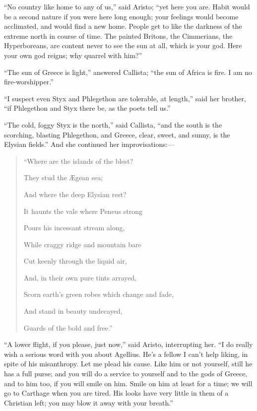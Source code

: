 ``No country like home to any of us,'' said Aristo;
``yet here you are. Habit would be a second nature if you were
here long enough; your feelings would become acclimated, and would
find a new home. People get to like the darkness of the extreme north
in course of time. The painted Britons, the Cimmerians, the
Hyperboreans, are content never to see the sun at all, which is
your god. Here your own god reigns; why quarrel with him?''

``The sun of Greece is light,'' answered Callista;
``the sun of Africa is fire. I am no fire-worshipper.''

``I suspect even Styx and Phlegethon are tolerable, at
length,'' said her brother, ``if Phlegethon and Styx there be,
as the poets tell us.''

``The cold, foggy Styx is the north,'' said Callista,
``and the south is the scorching, blasting Phlegethon, and Greece,
clear, sweet, and sunny, is the Elysian fields.'' And she
continued her improvisations:—

\begin{quote}

``Where are the islands of the blest?

They stud the Ægean sea;

And where the deep Elysian rest?

It haunts the vale where Peneus strong

Pours his incessant stream along,

While craggy ridge and mountain bare

Cut keenly through the liquid air,

And, in their own pure tints arrayed,

Scorn earth's green robes which change and fade,

And stand in beauty undecayed,

Guards of the bold and free.''

\end{quote}

``A lower flight, if you please, just now,'' said Aristo,
interrupting her. ``I do really wish a serious word with you about
Agellius. He's a fellow I can't help liking, in spite of his
misanthropy. Let me plead his cause. Like him or not yourself, still
he has a full purse; and you will do a service to yourself and to the
gods of Greece, and to him too, if you will smile on him. Smile on him
at least for a time; we will go to Carthage when you are tired. His
looks have very little in them of a Christian left; you may blow it
away with your breath.''

